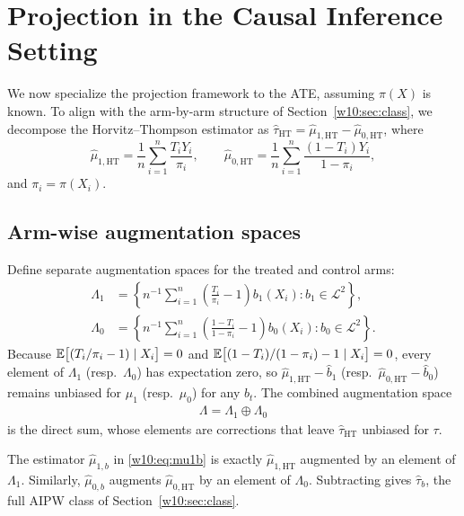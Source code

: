 \documentclass[master.tex]{subfiles}
\begin{document}
\section{Projection in the Causal Inference Setting}
\label{w10:sec:proj-causal}

We now specialize the projection framework to the ATE, assuming
$\pi(X)$ is known.  To align with the arm-by-arm structure of
Section~\ref{w10:sec:class}, we decompose the Horvitz--Thompson
estimator as $\hat\tau_{\mathrm{HT}} = \hat\mu_{1,\mathrm{HT}}
- \hat\mu_{0,\mathrm{HT}}$, where
\[
  \hat\mu_{1,\mathrm{HT}} = \frac{1}{n}\sum_{i=1}^n \frac{T_i Y_i}{\pi_i},
  \qquad
  \hat\mu_{0,\mathrm{HT}} = \frac{1}{n}\sum_{i=1}^n \frac{(1-T_i)Y_i}{1-\pi_i},
\]
and $\pi_i = \pi(X_i)$.

\subsection{Arm-wise augmentation spaces}
\label{w10:subsec:aug-space}

Define separate augmentation spaces for the treated and control arms:
\begin{align}
  \Lambda_1
  &= \left\{
       n^{-1}\sum_{i=1}^n
       \!\left(\frac{T_i}{\pi_i}-1\right) b_1(X_i)
       : b_1 \in \mathcal{L}^2
     \right\},
  \label{w10:eq:aug-space-1} \\[4pt]
  \Lambda_0
  &= \left\{
       n^{-1}\sum_{i=1}^n
       \!\left(\frac{1-T_i}{1-\pi_i}-1\right) b_0(X_i)
       : b_0 \in \mathcal{L}^2
     \right\}.
  \label{w10:eq:aug-space-0}
\end{align}
Because $\mathbb{E}\bigl[(T_i/\pi_i-1)\mid X_i\bigr]=0$ and
$\mathbb{E}\bigl[(1-T_i)/(1-\pi_i)-1\mid X_i\bigr]=0$, every element
of $\Lambda_1$ (resp.\ $\Lambda_0$) has expectation zero, so
$\hat\mu_{1,\mathrm{HT}} - \hat b_1$ (resp.\
$\hat\mu_{0,\mathrm{HT}} - \hat b_0$) remains unbiased for $\mu_1$
(resp.\ $\mu_0$) for any $b_t$.  The combined augmentation space
\begin{align}
  \Lambda = \Lambda_1 \oplus \Lambda_0
  \label{w10:eq:aug-space}
\end{align}
is the direct sum, whose elements are corrections that leave
$\hat\tau_{\mathrm{HT}}$ unbiased for $\tau$.

\begin{remark}
\label{w10:rem:conn-class}
The estimator $\hat\mu_{1,b}$ in \eqref{w10:eq:mu1b} is exactly
$\hat\mu_{1,\mathrm{HT}}$ augmented by an element of $\Lambda_1$.
Similarly, $\hat\mu_{0,b}$ augments $\hat\mu_{0,\mathrm{HT}}$ by an
element of $\Lambda_0$.  Subtracting gives $\hat\tau_b$, the full
AIPW class of Section~\ref{w10:sec:class}.
\end{remark}
\end{document}

